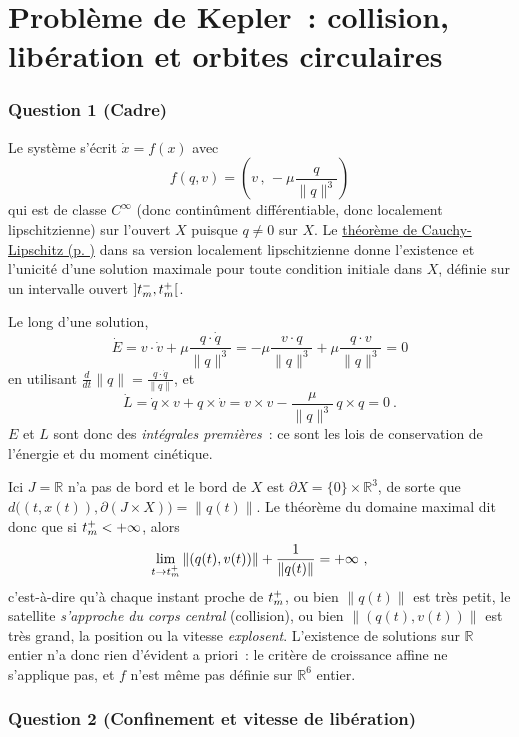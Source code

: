 \hypertarget{correc_kepler}{%
\section{Problème de Kepler~: collision, libération et orbites
circulaires}\label{correc_kepler}}

\hypertarget{answer-kepler-1}{%
\subsubsection*{Question 1 (Cadre)}\label{answer-kepler-1}}


Le système s'écrit \(\dot x = f(x)\) avec \[
f(q,v) = \left(v \,,\, -\mu\frac{q}{\|q\|^3}\right)
\] qui est de classe \(C^\infty\) (donc continûment différentiable, donc
localement lipschitzienne) sur l'ouvert \(X\) puisque \(q\neq 0\) sur
\(X\). Le \protect\hyperlink{theo_lips}{théorème de Cauchy-Lipschitz (p.
\pageref*{theo_lips})} dans sa version localement lipschitzienne donne
l'existence et l'unicité d'une solution maximale pour toute condition
initiale dans \(X\), définie sur un intervalle ouvert
\(\left]t_m^-,t_m^+\right[\).

Le long d'une solution, \[
\dot E = v\cdot \dot v + \mu\frac{q\cdot \dot q}{\|q\|^3} = -\mu\frac{v\cdot q}{\|q\|^3} + \mu\frac{q\cdot v}{\|q\|^3} = 0
\] en utilisant \(\frac{d}{dt}\|q\| = \frac{q\cdot\dot q}{\|q\|}\), et
\[
\dot L = \dot q\times v + q\times \dot v = v\times v - \frac{\mu}{\|q\|^3}\, q\times q = 0 \ .
\] \(E\) et \(L\) sont donc des \emph{intégrales premières}~: ce sont
les lois de conservation de l'énergie et du moment cinétique.

Ici \(J=\mathbb{R}\) n'a pas de bord et le bord de \(X\) est
\(\partial X = \{0\}\times \mathbb{R}^3\), de sorte que
\(d\big((t,x(t)),\partial(J\times X)\big) = \|q(t)\|\). Le théorème du
domaine maximal dit donc que si \(t_m^+<+\infty\), alors \[
\lim_{t\to t_m^+} \|(q(t),v(t))\| + \frac{1}{\|q(t)\|} = +\infty \ ,
\] c'est-à-dire qu'à chaque instant proche de \(t_m^+\), ou bien
\(\|q(t)\|\) est très petit, le satellite \emph{s'approche du corps
central} (collision), ou bien \(\|(q(t),v(t))\|\) est très grand, la
position ou la vitesse \emph{explosent}. L'existence de
solutions sur \(\mathbb{R}\) entier n'a donc rien d'évident a priori~:
le critère de croissance affine ne s'applique pas, et \(f\) n'est même
pas définie sur \(\mathbb{R}^6\) entier.

\hypertarget{answer-kepler-2}{%
\subsubsection*{Question 2 (Confinement et vitesse de
libération)}\label{answer-kepler-2}}

